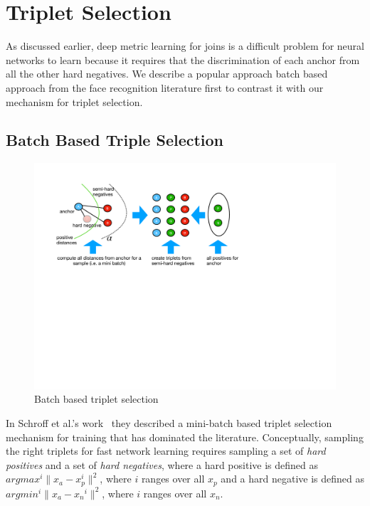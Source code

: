 \section{Triplet Selection}
As discussed earlier, deep metric learning for joins is a difficult problem for neural networks to learn because it requires that the discrimination of each anchor from all the other hard negatives.  We describe a popular approach batch based approach from the face recognition literature first to contrast it with our mechanism for triplet selection.

\subsection{Batch Based Triple Selection}
\begin{figure}
\includegraphics[width=1.0\linewidth]{triplet_selection}
\caption{Batch based triplet selection}
\label{triplet_selection}
\end{figure}

In Schroff et al.'s work~\cite{DBLP:conf/cvpr/SchroffKP15} they described a mini-batch based triplet selection mechanism for training that has dominated the literature.  Conceptually, sampling the right triplets for fast network learning requires sampling a set of \textit{hard positives} and a set of \textit{hard negatives}, where a hard positive is defined as $argmax^i \| x_{a} - x_{p}^i \|^2$, where $i$ ranges over all $x_p$ and a hard negative is defined as $argmin^i \| x_{a} - x{_n}^i \|^2$, where $i$ ranges over all $x_n$. 

